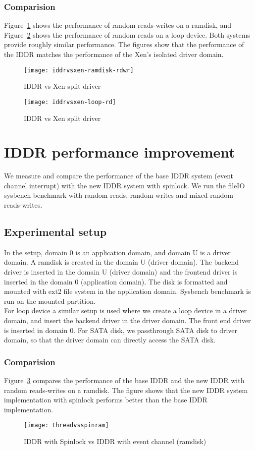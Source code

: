 \subsubsection*{Comparision}
Figure~\ref{fig:iddrvsxen-ramdisk-rdwr} shows the performance of random reads-writes on a ramdisk, and Figure~\ref{fig:iddrvsxen-loop-rd} shows the performance of random reads on a loop device. Both systems provide roughly similar performance. The figures show that the performance of the IDDR matches the performance of the Xen's isolated driver domain. 
\begin{figure}[!ht]
\centering
\texttt{[image: iddrvsxen-ramdisk-rdwr]}
\caption{IDDR vs Xen split driver}
\label{fig:iddrvsxen-ramdisk-rdwr}
\end{figure}
\begin{figure}[!ht]
\centering
\texttt{[image: iddrvsxen-loop-rd]}
\caption{IDDR vs Xen split driver}
\label{fig:iddrvsxen-loop-rd}
\end{figure}

\section{IDDR performance improvement}
We measure and compare the performance of the base IDDR system (event channel interrupt) with the new IDDR system with spinlock. We run the fileIO sysbench benchmark with random reads, random writes and mixed random reads-writes. 
\subsection{Experimental setup}
In the setup, domain 0 is an application domain, and domain U is a driver domain. A ramdisk is created in the domain U (driver domain). The backend driver is inserted in the domain U (driver domain) and the frontend driver is inserted in the domain 0 (application domain). The disk is formatted and mounted with ext2 file system in the application domain. Sysbench benchmark is run on the mounted partition. 
\\[3mm]
For loop device a similar setup is used where we create a loop device in a driver domain, and insert the backend driver in the driver domain. The front end driver is inserted in domain 0. For SATA disk, we passthrough SATA disk to driver domain, so that the driver domain can directly access the SATA disk. 
\subsubsection*{Comparision}
Figure~\ref{fig:threadvsspinram} compares the performance of the base IDDR and the new IDDR with random reads-writes on a ramdisk. The figure shows that the new IDDR system implementation with spinlock performs better than the base IDDR implementation. 
\begin{figure}[!ht]
\centering
\texttt{[image: threadvsspinram]}
\caption{IDDR with Spinlock vs IDDR with event channel (ramdisk)}
\label{fig:threadvsspinram}
\end{figure}



